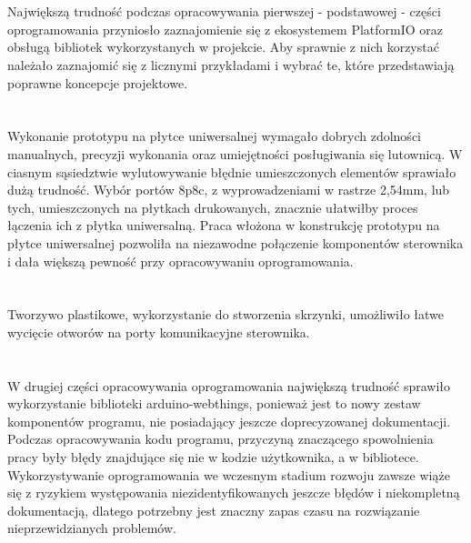 \documentclass[11pt]{report}
\begin{document}
\section{}
Największą trudność podczas opracowywania pierwszej - podstawowej - części oprogramowania przyniosło zaznajomienie się z ekosystemem PlatformIO oraz obsługą bibliotek wykorzystanych w projekcie. Aby sprawnie z nich korzystać należało zaznajomić się z licznymi przykładami i wybrać te, które przedstawiają poprawne koncepcje projektowe.

\section{}
Wykonanie prototypu na płytce uniwersalnej wymagało dobrych zdolności manualnych, precyzji wykonania oraz umiejętności posługiwania się lutownicą. W ciasnym sąsiedztwie wylutowywanie błędnie umieszczonych elementów sprawiało dużą trudność.
Wybór portów 8p8c, z wyprowadzeniami w rastrze 2,54mm, lub tych, umieszczonych na płytkach drukowanych, znacznie ułatwiłby proces łączenia ich z płytka uniwersalną.
Praca włożona w konstrukcję prototypu na płytce uniwersalnej pozwoliła na niezawodne połączenie komponentów sterownika i dała większą pewność przy opracowywaniu oprogramowania.

\section{}
Tworzywo plastikowe, wykorzystanie do stworzenia skrzynki, umożliwiło łatwe wycięcie otworów na porty komunikacyjne sterownika.

\section{}
W drugiej części opracowywania oprogramowania największą trudność sprawiło wykorzystanie biblioteki arduino-webthings, ponieważ jest to nowy zestaw komponentów programu, nie posiadający jeszcze doprecyzowanej dokumentacji. Podczas opracowywania kodu programu, przyczyną znaczącego spowolnienia pracy były błędy znajdujące się nie w kodzie użytkownika, a w bibliotece.
Wykorzystywanie oprogramowania we wczesnym stadium rozwoju zawsze wiąże się z ryzykiem występowania niezidentyfikowanych jeszcze błędów i niekompletną dokumentacją, dlatego potrzebny jest znaczny zapas czasu na rozwiązanie nieprzewidzianych problemów.
\end{document}
